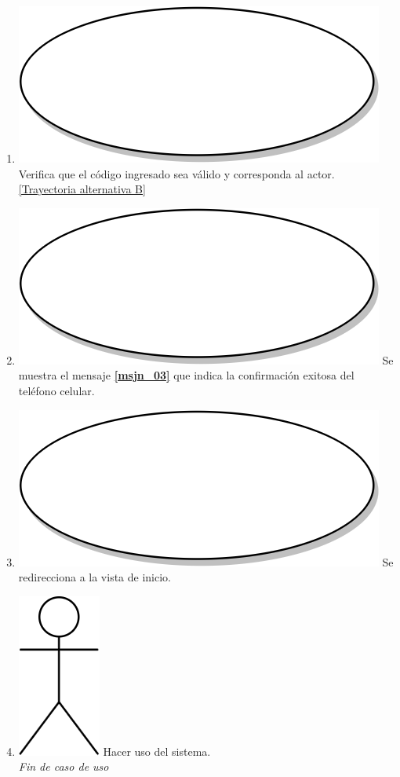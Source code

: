 \begin{enumerate}
  \item {\includegraphics[scale=.05]{Capitulo3/img/proceso.png} Verifica que el código ingresado sea válido y corresponda al actor. \hyperref[cu2_1_ta_b]{[Trayectoria alternativa B]}}
  \item {\includegraphics[scale=.05]{Capitulo3/img/proceso.png} Se muestra el mensaje \textbf{\ref{msjn_03}} que indica la confirmación exitosa del teléfono celular.}
  \item {\includegraphics[scale=.05]{Capitulo3/img/proceso.png} Se redirecciona a la vista de inicio.}
    \item {\includegraphics[scale=.1]{Capitulo3/img/actor.png} Hacer uso del sistema.} \\
  \textit{Fin de caso de uso} \\	
\end{enumerate}

